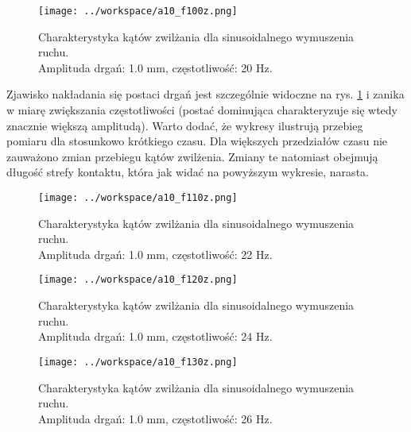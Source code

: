 \documentclass[a4paper,11pt,twoside,openright]{article} %
\begin{document}
\captionsetup{skip=0pt}
\begin{figure}[!h]
\captionsetup{justification=centering}
\begin{center}
\texttt{[image: ../workspace/a10\_f100z.png]} 
\end{center}
\caption{Charakterystyka kątów zwilżania dla sinusoidalnego wymuszenia ruchu.  \\Amplituda drgań: 1.0 mm,  częstotliwość: 20 Hz.}
\label{fig:theta(t)_1}
\end{figure} 
\noindent Zjawisko nakładania się postaci drgań jest szczególnie widoczne na rys. \ref{fig:theta(t)_1} i zanika w miarę zwiększania częstotliwości (postać dominująca charakteryzuje się wtedy znacznie większą amplitudą). Warto dodać, że wykresy ilustrują przebieg pomiaru dla stosunkowo krótkiego czasu. Dla większych przedziałów czasu nie zauważono zmian przebiegu kątów zwilżenia. Zmiany te natomiast obejmują długość strefy kontaktu, która jak widać na powyższym wykresie, narasta.


\newpage
\captionsetup{skip=0pt}
\begin{figure}[!h]
\captionsetup{justification=centering}
\begin{center}
\texttt{[image: ../workspace/a10\_f110z.png]} 
\end{center}
\caption{Charakterystyka kątów zwilżania dla sinusoidalnego wymuszenia ruchu.  \\Amplituda drgań: 1.0 mm,  częstotliwość: 22 Hz.}
\label{fig:theta(t)_2}
\end{figure} 

\captionsetup{skip=0pt}
\begin{figure}[!h]
\captionsetup{justification=centering}
\begin{center}
\texttt{[image: ../workspace/a10\_f120z.png]} 
\end{center}
\caption{Charakterystyka kątów zwilżania dla sinusoidalnego wymuszenia ruchu.  \\Amplituda drgań: 1.0 mm,  częstotliwość: 24 Hz.}
\label{fig:theta(t)_3}
\end{figure} 
\newpage

\captionsetup{skip=0pt}
\begin{figure}[!h]
\captionsetup{justification=centering}
\begin{center}
\texttt{[image: ../workspace/a10\_f130z.png]} 
\end{center}
\caption{Charakterystyka kątów zwilżania dla sinusoidalnego wymuszenia ruchu.  \\Amplituda drgań: 1.0 mm,  częstotliwość: 26 Hz.}
\label{fig:theta(t)_4}
\end{figure} 
\end{document}
